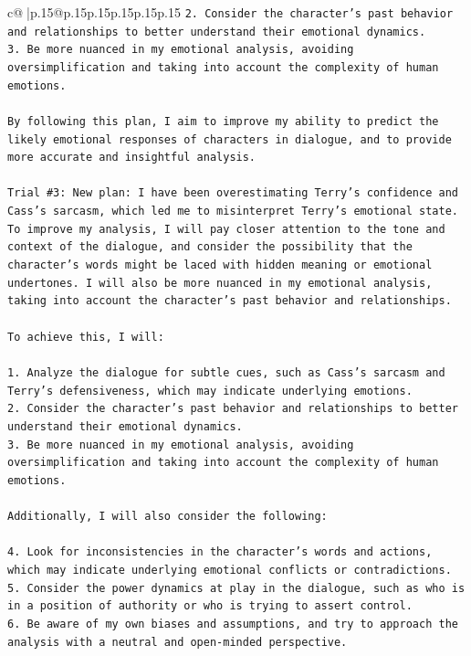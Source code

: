 \documentclass{article}
\begin{document}
{\begin{supertabular}{c@{$\;$}|p{.15\linewidth}@{}p{.15\linewidth}p{.15\linewidth}p{.15\linewidth}p{.15\linewidth}p{.15\linewidth}}
{{{\texttt{2. Consider the character's past behavior and relationships to better understand their emotional dynamics.} \\
\texttt{3. Be more nuanced in my emotional analysis, avoiding oversimplification and taking into account the complexity of human emotions.} \\
\\ 
\texttt{By following this plan, I aim to improve my ability to predict the likely emotional responses of characters in dialogue, and to provide more accurate and insightful analysis.} \\
\\ 
\texttt{Trial \#3: New plan: I have been overestimating Terry's confidence and Cass's sarcasm, which led me to misinterpret Terry's emotional state. To improve my analysis, I will pay closer attention to the tone and context of the dialogue, and consider the possibility that the character's words might be laced with hidden meaning or emotional undertones. I will also be more nuanced in my emotional analysis, taking into account the character's past behavior and relationships.} \\
\\ 
\texttt{To achieve this, I will:} \\
\\ 
\texttt{1. Analyze the dialogue for subtle cues, such as Cass's sarcasm and Terry's defensiveness, which may indicate underlying emotions.} \\
\texttt{2. Consider the character's past behavior and relationships to better understand their emotional dynamics.} \\
\texttt{3. Be more nuanced in my emotional analysis, avoiding oversimplification and taking into account the complexity of human emotions.} \\
\\ 
\texttt{Additionally, I will also consider the following:} \\
\\ 
\texttt{4. Look for inconsistencies in the character's words and actions, which may indicate underlying emotional conflicts or contradictions.} \\
\texttt{5. Consider the power dynamics at play in the dialogue, such as who is in a position of authority or who is trying to assert control.} \\
\texttt{6. Be aware of my own biases and assumptions, and try to approach the analysis with a neutral and open{-}minded perspective.} \\
}}}
\end{supertabular}}
\end{document}
